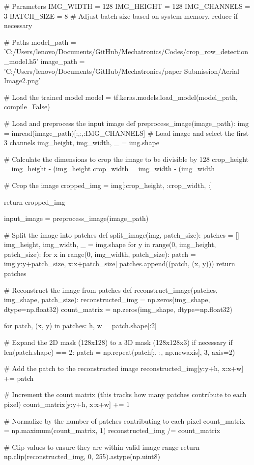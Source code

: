 \documentclass[conference]{IEEEtran}
\begin{document}
# Parameters
IMG_WIDTH = 128
IMG_HEIGHT = 128
IMG_CHANNELS = 3
BATCH_SIZE = 8  # Adjust batch size based on system memory, reduce if necessary

# Paths
model_path = 'C:/Users/lenovo/Documents/GitHub/Mechatronics/Codes/crop_row_detection_model.h5'
image_path = 'C:/Users/lenovo/Documents/GitHub/Mechatronics/paper Submission/Aerial Image2.png'

# Load the trained model
model = tf.keras.models.load_model(model_path, compile=False)

# Load and preprocess the input image
def preprocess_image(image_path):
img = imread(image_path)[:,:,:IMG_CHANNELS]  # Load image and select the first 3 channels
img_height, img_width, _ = img.shape

# Calculate the dimensions to crop the image to be divisible by 128
crop_height = img_height - (img_height %
crop_width = img_width - (img_width %

# Crop the image
cropped_img = img[:crop_height, :crop_width, :]

return cropped_img

input_image = preprocess_image(image_path)

# Split the image into patches
def split_image(img, patch_size):
patches = []
img_height, img_width, _ = img.shape
for y in range(0, img_height, patch_size):
for x in range(0, img_width, patch_size):
patch = img[y:y+patch_size, x:x+patch_size]
patches.append((patch, (x, y)))
return patches

# Reconstruct the image from patches
def reconstruct_image(patches, img_shape, patch_size):
reconstructed_img = np.zeros(img_shape, dtype=np.float32)
count_matrix = np.zeros(img_shape, dtype=np.float32)

for patch, (x, y) in patches:
h, w = patch.shape[:2]

# Expand the 2D mask (128x128) to a 3D mask (128x128x3) if necessary
if len(patch.shape) == 2:
patch = np.repeat(patch[:, :, np.newaxis], 3, axis=2)

# Add the patch to the reconstructed image
reconstructed_img[y:y+h, x:x+w] += patch

# Increment the count matrix (this tracks how many patches contribute to each pixel)
count_matrix[y:y+h, x:x+w] += 1

# Normalize by the number of patches contributing to each pixel
count_matrix = np.maximum(count_matrix, 1)
reconstructed_img /= count_matrix

# Clip values to ensure they are within valid image range
return np.clip(reconstructed_img, 0, 255).astype(np.uint8)
\end{document}
